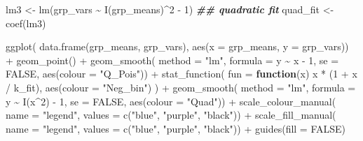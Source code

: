 \documentclass[
  12pt,
]{book}
\newenvironment{Shaded}{\begin{snugshade}}{\end{snugshade}}
\newcommand{\AttributeTok}[1]{\textcolor[rgb]{0.77,0.63,0.00}{#1}}
\newcommand{\ConstantTok}[1]{\textcolor[rgb]{0.00,0.00,0.00}{#1}}
\newcommand{\ControlFlowTok}[1]{\textcolor[rgb]{0.13,0.29,0.53}{\textbf{#1}}}
\newcommand{\DecValTok}[1]{\textcolor[rgb]{0.00,0.00,0.81}{#1}}
\newcommand{\DocumentationTok}[1]{\textcolor[rgb]{0.56,0.35,0.01}{\textbf{\textit{#1}}}}
\newcommand{\FunctionTok}[1]{\textcolor[rgb]{0.00,0.00,0.00}{#1}}
\newcommand{\NormalTok}[1]{#1}
\newcommand{\OtherTok}[1]{\textcolor[rgb]{0.56,0.35,0.01}{#1}}
\newcommand{\SpecialCharTok}[1]{\textcolor[rgb]{0.00,0.00,0.00}{#1}}
\newcommand{\StringTok}[1]{\textcolor[rgb]{0.31,0.60,0.02}{#1}}
\begin{document}
\begin{Shaded}
\begin{Highlighting}[]
\NormalTok{lm3 }\OtherTok{\textless{}{-}} \FunctionTok{lm}\NormalTok{(grp\_vars }\SpecialCharTok{\textasciitilde{}} \FunctionTok{I}\NormalTok{(grp\_means)}\SpecialCharTok{\^{}}\DecValTok{2} \SpecialCharTok{{-}} \DecValTok{1}\NormalTok{) }\DocumentationTok{\#\# quadratic fit}
\NormalTok{quad\_fit }\OtherTok{\textless{}{-}} \FunctionTok{coef}\NormalTok{(lm3)}

\FunctionTok{ggplot}\NormalTok{(}
  \FunctionTok{data.frame}\NormalTok{(grp\_means, grp\_vars),}
  \FunctionTok{aes}\NormalTok{(}\AttributeTok{x =}\NormalTok{ grp\_means, }\AttributeTok{y =}\NormalTok{ grp\_vars)) }\SpecialCharTok{+}
  \FunctionTok{geom\_point}\NormalTok{() }\SpecialCharTok{+}
  \FunctionTok{geom\_smooth}\NormalTok{(}
    \AttributeTok{method =} \StringTok{"lm"}\NormalTok{, }\AttributeTok{formula =}\NormalTok{ y }\SpecialCharTok{\textasciitilde{}}\NormalTok{ x }\SpecialCharTok{{-}} \DecValTok{1}\NormalTok{, }\AttributeTok{se =} \ConstantTok{FALSE}\NormalTok{,}
    \FunctionTok{aes}\NormalTok{(}\AttributeTok{colour =} \StringTok{"Q\_Pois"}\NormalTok{)) }\SpecialCharTok{+}
  \FunctionTok{stat\_function}\NormalTok{(}
    \AttributeTok{fun =} \ControlFlowTok{function}\NormalTok{(x) x }\SpecialCharTok{*}\NormalTok{ (}\DecValTok{1} \SpecialCharTok{+}\NormalTok{ x }\SpecialCharTok{/}\NormalTok{ k\_fit),}
    \FunctionTok{aes}\NormalTok{(}\AttributeTok{colour =} \StringTok{"Neg\_bin"}\NormalTok{)}
\NormalTok{  ) }\SpecialCharTok{+}
  \FunctionTok{geom\_smooth}\NormalTok{(}
    \AttributeTok{method =} \StringTok{"lm"}\NormalTok{, }\AttributeTok{formula =}\NormalTok{ y }\SpecialCharTok{\textasciitilde{}} \FunctionTok{I}\NormalTok{(x}\SpecialCharTok{\^{}}\DecValTok{2}\NormalTok{) }\SpecialCharTok{{-}} \DecValTok{1}\NormalTok{, }\AttributeTok{se =} \ConstantTok{FALSE}\NormalTok{,}
    \FunctionTok{aes}\NormalTok{(}\AttributeTok{colour =} \StringTok{"Quad"}\NormalTok{)) }\SpecialCharTok{+}
  \FunctionTok{scale\_colour\_manual}\NormalTok{(}
    \AttributeTok{name =} \StringTok{"legend"}\NormalTok{,}
    \AttributeTok{values =} \FunctionTok{c}\NormalTok{(}\StringTok{"blue"}\NormalTok{, }\StringTok{"purple"}\NormalTok{, }\StringTok{"black"}\NormalTok{)) }\SpecialCharTok{+}
  \FunctionTok{scale\_fill\_manual}\NormalTok{(}
    \AttributeTok{name =} \StringTok{"legend"}\NormalTok{,}
    \AttributeTok{values =} \FunctionTok{c}\NormalTok{(}\StringTok{"blue"}\NormalTok{, }\StringTok{"purple"}\NormalTok{, }\StringTok{"black"}\NormalTok{)) }\SpecialCharTok{+}
  \FunctionTok{guides}\NormalTok{(}\AttributeTok{fill =} \ConstantTok{FALSE}\NormalTok{)}
\end{Highlighting}
\end{Shaded}
\end{document}
